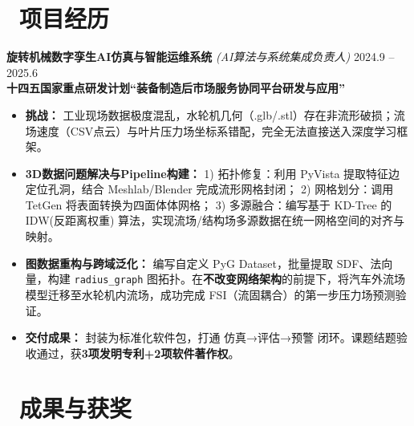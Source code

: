 \documentclass[11pt]{article}
\begin{document}
\section{\makebox[\widthof{\faBriefcase}][c]{\color{CVBlue}%
\faBriefcase}\ 项目经历}

\textbf{旋转机械数字孪生AI仿真与智能运维系统} 
\textit{(AI算法与系统集成负责人)} 
\hfill 2024.9 -- 2025.6\\[0.2em]
\textcolor{CVBlue}{\textbf{十四五国家重点研发计划``装备制造后市场服务协同平台研发与应用''}}
\begin{itemize}
    \item \textbf{挑战：} 工业现场数据极度混乱，水轮机几何（.glb/.stl）存在非流形破损；流场速度（CSV点云）与叶片压力场坐标系错配，完全无法直接送入深度学习框架。
    \item \textbf{3D数据问题解决与Pipeline构建：} 
        1) 拓扑修复：利用 PyVista 提取特征边定位孔洞，结合 Meshlab/Blender 完成流形网格封闭；
        2) 网格划分：调用 TetGen 将表面转换为四面体体网格；
        3) 多源融合：编写基于 KD-Tree 的 IDW(反距离权重) 算法，实现流场/结构场多源数据在统一网格空间的对齐与映射。
    \item \textbf{图数据重构与跨域泛化：} 编写自定义 PyG Dataset，批量提取 SDF、法向量，构建 \texttt{radius\_graph} 图拓扑。在\textbf{不改变网络架构}的前提下，将汽车外流场模型迁移至水轮机内流场，成功完成 FSI（流固耦合）的第一步压力场预测验证。
    \item \textbf{交付成果：} 封装为标准化软件包，打通 仿真→评估→预警 闭环。课题结题验收通过，获\textbf{3项发明专利+2项软件著作权}。
\end{itemize}



\section{%
    \makebox[\widthof{\faTrophy}][c]%
    {\color{CVBlue}\faTrophy}\ 成果与获奖%
}
\end{document}
